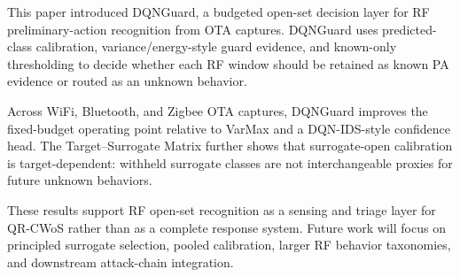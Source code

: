 This paper introduced DQNGuard, a budgeted open-set decision layer for RF preliminary-action recognition from OTA captures. DQNGuard uses predicted-class calibration, variance/energy-style guard evidence, and known-only thresholding to decide whether each RF window should be retained as known PA evidence or routed as an unknown behavior.

Across WiFi, Bluetooth, and Zigbee OTA captures, DQNGuard improves the fixed-budget operating point relative to VarMax and a DQN-IDS-style confidence head. The Target--Surrogate Matrix further shows that surrogate-open calibration is target-dependent: withheld surrogate classes are not interchangeable proxies for future unknown behaviors.

These results support RF open-set recognition as a sensing and triage layer for QR-CWoS rather than as a complete response system. Future work will focus on principled surrogate selection, pooled calibration, larger RF behavior taxonomies, and downstream attack-chain integration.
